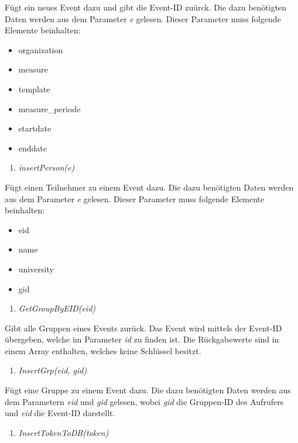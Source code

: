 \documentclass[12pt,parskip=full, pagea4]{scrreprt}
\begin{document}
			\leftskip=1.5cm	F\"ugt ein neues Event dazu und gibt die Event-ID zu\"urck. Die dazu benötigten Daten werden aus dem Parameter \textit{e} gelesen. Dieser Parameter muss folgende Elemente beinhalten:
			\begin{itemize}
				\item \leftskip=1.5cm organization
				\item \leftskip=1.5cm measure
				\item \leftskip=1.5cm template
				\item \leftskip=1.5cm measure\_periode
				\item \leftskip=1.5cm startdate
				\item \leftskip=1.5cm enddate
			\end{itemize}
			\begin{enumerate}[resume]
				\item \textit{insertPerson(e)}
			\end{enumerate}
			\leftskip=1.5cm	F\"ugt einen Teilnehmer zu einem Event dazu. Die dazu benötigten Daten werden aus dem Parameter \textit{e} gelesen. Dieser Parameter muss folgende Elemente beinhalten:
			\begin{itemize}
				\item \leftskip=1.5cm eid
				\item \leftskip=1.5cm name
				\item \leftskip=1.5cm university
				\item \leftskip=1.5cm gid
			\end{itemize}
			\begin{enumerate}[resume]
				\item \textit{GetGroupByEID(eid)}
			\end{enumerate}
			\leftskip=1.5cm	Gibt alle Gruppen eines Events zur\"uck. Das Event wird mittels der Event-ID \"ubergeben, welche im Parameter \textit{id} zu finden ist. Die R\"uckgabewerte sind in einem Array enthalten, welches keine Schlüssel besitzt.
			\begin{enumerate}[resume]
				\item \textit{InsertGrp(eid, gid)}
			\end{enumerate}
			\leftskip=1.5cm	F\"ugt eine Gruppe zu einem Event dazu. Die dazu benötigten Daten werden aus dem Parametern \textit{eid} und \textit{gid} gelesen, wobei \textit{gid} die Gruppen-ID des Aufrufers und \textit{eid} die Event-ID darstellt.
			\begin{enumerate}[resume]
				\item \textit{InsertTokenToDB(token)}
			\end{enumerate}
\end{document}
